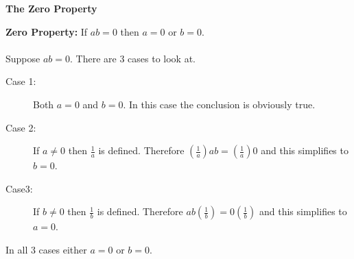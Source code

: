 \documentclass[12pt]{article}
\begin{document}
\begin{center}
  \Large{\textbf{The Zero Property}}
  \end{center}
  \textbf{Zero Property:} If $ab=0$ then $a=0$ or $b=0$.\\\\
Suppose $ab=0$. There are $3$ cases to look at. 
\begin{description}
\item[Case 1:] Both $a=0$ and $b=0$. In this case the conclusion
is obviously true.
\item[Case 2:] If $a \neq 0$ then $\frac{1}{a}$ is defined. 
Therefore $\left(\frac{1}{a}\right)ab=\left(\frac{1}{a}\right)0$
and this simplifies to $b=0$.
\item[Case3:] If $b \neq 0$ then $\frac{1}{b}$ is defined.
Therefore $ab\left(\frac{1}{b}\right)=0\left(\frac{1}{b}\right)$
and this simplifies to $a=0$. 
\end{description}
In all $3$ cases either $a=0$ or $b=0$.
\end{document}
